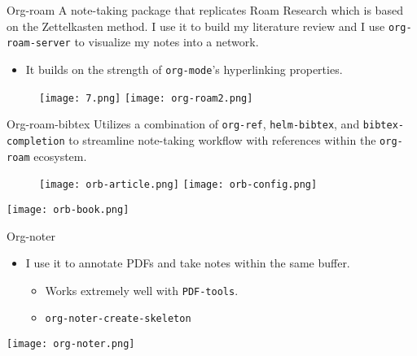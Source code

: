 \documentclass[presentation,xcolor=table]{beamer}
\begin{document}
\begin{frame}{Org-roam}
 A note-taking package that replicates Roam Research which is based on the Zettelkasten method. I use it to build my literature review and I use \texttt{org-roam-server} to visualize my notes into a network.

\begin{itemize}
\item It builds on the strength of \texttt{org-mode}'s hyperlinking properties.
\end{itemize}


\centering
\begin{figure}
\texttt{[image: 7.png]}
\texttt{[image: org-roam2.png]}
\end{figure}
\end{frame}

\begin{frame}{Org-roam-bibtex}
 Utilizes a combination of \texttt{org-ref}, \texttt{helm-bibtex}, and \texttt{bibtex-completion} to streamline note-taking workflow with references within the \texttt{org-roam} ecosystem.

\centering
\begin{figure}
\texttt{[image: orb-article.png]}
\texttt{[image: orb-config.png]}
\end{figure}

\begin{center}
\texttt{[image: orb-book.png]}
\end{center}
\end{frame}

\begin{frame}[label={sec:orgd61e046},fragile]{Org-noter}
 \begin{itemize}
\item I use it to annotate PDFs and take notes within the same buffer.
\begin{itemize}
\item Works extremely well with \texttt{PDF-tools}.
\item \texttt{org-noter-create-skeleton}
\end{itemize}
\end{itemize}

\begin{center}
\texttt{[image: org-noter.png]}
\end{center}
\end{frame}
\end{document}
